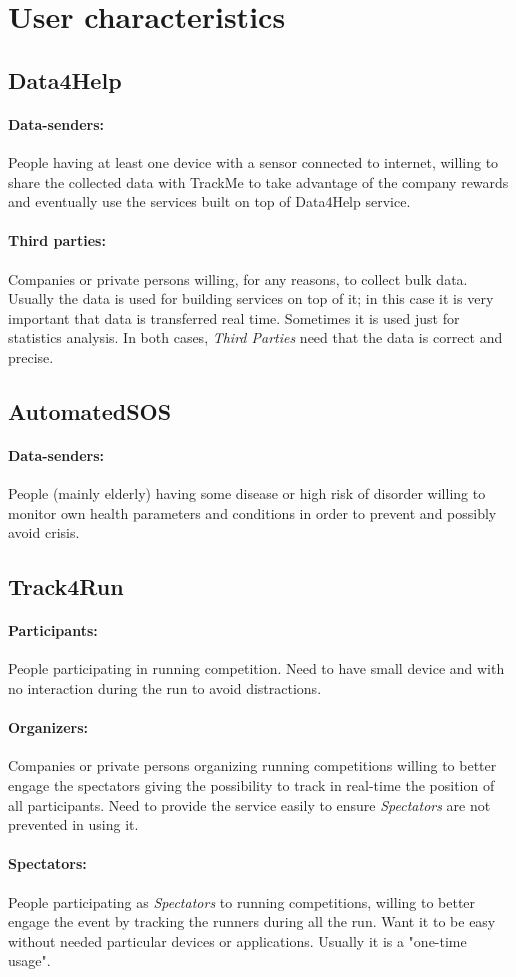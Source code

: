 \documentclass[../../rasd.tex]{subfiles}
\begin{document}
\section{User characteristics}
			\subsection{Data4Help}
				\paragraph{Data-senders:}
				People having at least one device with a sensor connected to internet, willing to share the collected data with TrackMe to take advantage of the company rewards and eventually use the services built on top of Data4Help service.
				\paragraph{Third parties:}
				Companies or private persons willing, for any reasons, to collect bulk data. Usually the data is used for building services on top of it; in this case it is very important that data is transferred real time. Sometimes it is used just for statistics analysis. In both cases, \textit{Third Parties} need that the data is correct and precise. 
			\subsection{AutomatedSOS}
				\paragraph{Data-senders:}
				People (mainly elderly) having some disease or high risk of disorder willing to monitor own health parameters and conditions in order to prevent and possibly avoid crisis.
			\subsection{Track4Run}
				\paragraph{Participants:}
				People participating in running competition. Need to have small device and with no interaction during the run to avoid distractions.
				\paragraph{Organizers:}
				Companies or private persons organizing running competitions willing to better engage the spectators giving the possibility to track in real-time the position of all participants. Need to provide the service easily to ensure \textit{Spectators} are not prevented in using it.
				\paragraph{Spectators:}
				People participating as \textit{Spectators} to running competitions, willing to better engage the event by tracking the runners during all the run. Want it to be easy without needed particular devices or applications. Usually it is a "one-time usage".
\end{document}
